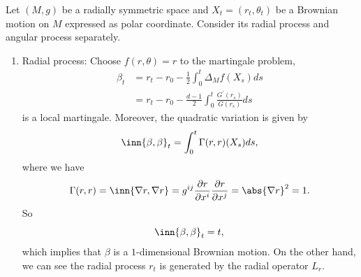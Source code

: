 \begin{exam}
    Let $(M,g)$ be a radially symmetric space and $X_t = (r_t,\theta_t)$ be a Brownian motion on $M$ expressed as polar coordinate. Consider its radial process and angular process separately.
    \begin{enumerate}[label=(\arabic{*})]
        \item Radial process: Choose $f(r,\theta) = r$ to the martingale problem,
        \begin{align*}
            \beta_t &= r_t - r_0 -\frac{1}{2}\int_0^t\Delta_Mf(X_s)ds \\
            &= r_t - r_0 - \frac{d-1}{2} \int_0^t \frac{G^\prime(r_s)}{G(r_s)}ds
        \end{align*}
        is a local martingale. Moreover, the quadratic variation is given by
        \begin{equation*}
            \inn{\beta,\beta}_t = \int_0^t\Gamma(r,r)(X_s)ds,
        \end{equation*}
        where we have
        \begin{equation*}
            \Gamma(r,r) = \inn{\nabla r,\nabla r} =g^{ij}\frac{\partial r}{\partial x^i}\frac{\partial r}{\partial x^j} = \abs{\nabla r}^2 = 1.
        \end{equation*}
        So
        \begin{equation*}
            \inn{\beta,\beta}_t = t,
        \end{equation*}
        which implies that $\beta$ is a $1$-dimensional Brownian motion. On the other hand, we can see the radial process $r_t$ is generated by the radial operator $L_r$.


\end{enumerate}
\end{exam}
